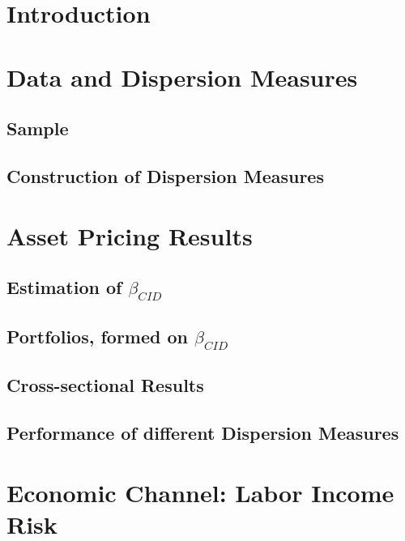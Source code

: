 \documentclass[16pt]{article}
\begin{document}






\newpage


\section{Introduction} \label{sec:Model}

\section{Data and Dispersion Measures} \label{sec:Model}
\subsection{Sample}
\subsection{Construction of Dispersion Measures}


\section{Asset Pricing Results} \label{sec:Model}
\subsection{Estimation of $\beta_{CID}$}
\subsection{Portfolios, formed on $\beta_{CID}$}
\subsection{Cross-sectional Results}
\subsection{Performance of different Dispersion Measures}


\section{Economic Channel: Labor Income Risk} \label{sec:Model}
\end{document}
